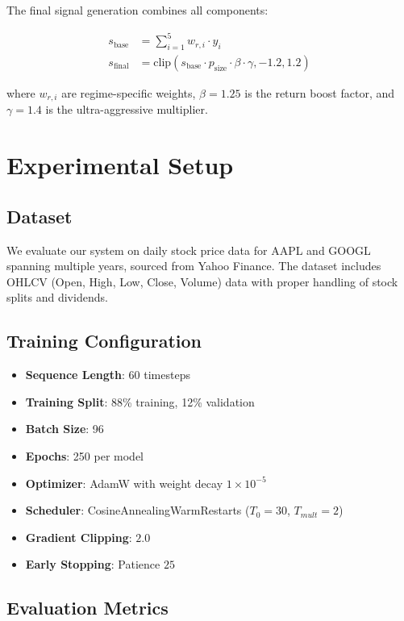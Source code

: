 \documentclass[10pt,twocolumn]{article}
\begin{document}
The final signal generation combines all components:

\begin{align}
s_{\text{base}} &= \sum_{i=1}^{5} w_{r,i} \cdot y_i \\
s_{\text{final}} &= \text{clip}(s_{\text{base}} \cdot p_{\text{size}} \cdot \beta \cdot \gamma, -1.2, 1.2)
\end{align}

where $w_{r,i}$ are regime-specific weights, $\beta = 1.25$ is the return boost factor, and $\gamma = 1.4$ is the ultra-aggressive multiplier.

\section{Experimental Setup}

\subsection{Dataset}

We evaluate our system on daily stock price data for AAPL and GOOGL spanning multiple years, sourced from Yahoo Finance. The dataset includes OHLCV (Open, High, Low, Close, Volume) data with proper handling of stock splits and dividends.

\subsection{Training Configuration}

\begin{itemize}[itemsep=1pt]
\item \textbf{Sequence Length}: 60 timesteps
\item \textbf{Training Split}: 88\% training, 12\% validation
\item \textbf{Batch Size}: 96
\item \textbf{Epochs}: 250 per model
\item \textbf{Optimizer}: AdamW with weight decay $1 \times 10^{-5}$
\item \textbf{Scheduler}: CosineAnnealingWarmRestarts ($T_0=30$, $T_{mult}=2$)
\item \textbf{Gradient Clipping}: $2.0$
\item \textbf{Early Stopping}: Patience $25$
\end{itemize}

\subsection{Evaluation Metrics}
\end{document}
